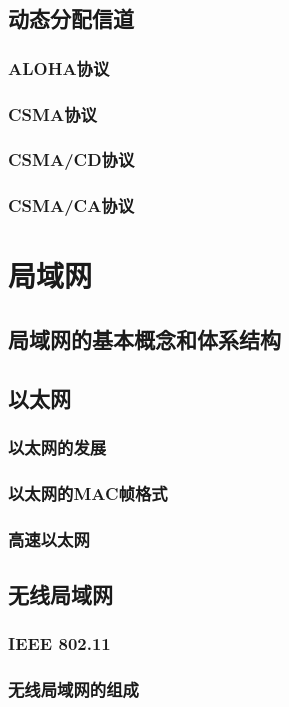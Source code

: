 \documentclass[lang=cn,newtx,10pt,scheme=chinese]{../../elegantbook}
\begin{document}
\subsection{动态分配信道}
\subsubsection{ALOHA协议}
\subsubsection{CSMA协议}
\subsubsection{CSMA/CD协议}
\subsubsection{CSMA/CA协议}


\section{局域网}
\subsection{局域网的基本概念和体系结构}
\subsection{以太网}
\subsubsection{以太网的发展}
\subsubsection{以太网的MAC帧格式}
\subsubsection{高速以太网}
\subsection{无线局域网}
\subsubsection{IEEE 802.11}
\subsubsection{无线局域网的组成}
\end{document}
